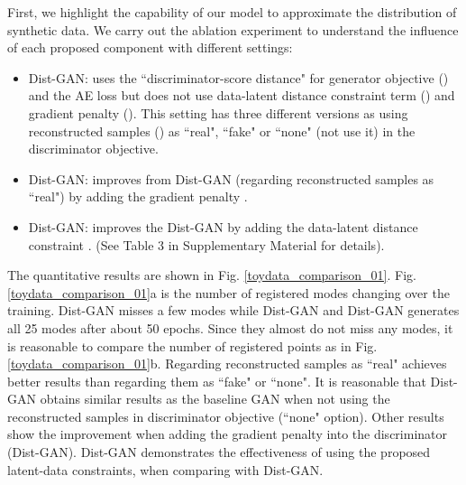 \documentclass[runningheads]{llncs}
\begin{document}
First, we highlight the capability of our model to approximate the distribution  of synthetic data. We carry out the ablation experiment to understand the influence of each proposed component with different settings:
\begin{itemize}
\item Dist-GAN: uses the ``discriminator-score distance" for generator objective () and the AE loss  but does not use data-latent distance constraint term () and gradient penalty (). This setting has three different versions as using reconstructed samples () as ``real", ``fake" or ``none" (not use it) in the discriminator objective. 
\item Dist-GAN: improves from Dist-GAN (regarding reconstructed samples as ``real") by adding the gradient penalty .
\item Dist-GAN: improves the Dist-GAN by adding the data-latent distance constraint . (See Table 3 in Supplementary Material for details).
\end{itemize}




The quantitative results are shown in Fig. \ref{toydata_comparison_01}. Fig. \ref{toydata_comparison_01}a is the number of registered modes changing over the training. Dist-GAN misses a few modes while Dist-GAN and Dist-GAN generates all 25 modes after about 50 epochs. Since they almost do not miss any modes, it is reasonable to compare the number of registered points as in Fig. \ref{toydata_comparison_01}b. Regarding reconstructed samples as ``real" achieves better results than regarding them as  ``fake" or ``none". 
It is reasonable that Dist-GAN obtains similar results as the baseline GAN when not using the reconstructed samples in discriminator objective (``none" option). Other results show the improvement when adding the gradient penalty into the discriminator (Dist-GAN). Dist-GAN demonstrates the effectiveness of using the proposed latent-data constraints, when comparing with Dist-GAN. 
\end{document}
